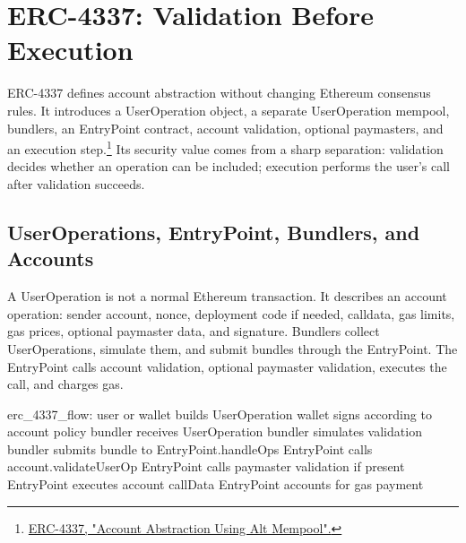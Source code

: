 \section{ERC-4337: Validation Before Execution}

ERC-4337 defines account abstraction without changing Ethereum consensus rules. It introduces a UserOperation object, a separate UserOperation mempool, bundlers, an EntryPoint contract, account validation, optional paymasters, and an execution step.\footnote{\href{https://eips.ethereum.org/EIPS/eip-4337}{ERC-4337, "Account Abstraction Using Alt Mempool".}} Its security value comes from a sharp separation: validation decides whether an operation can be included; execution performs the user's call after validation succeeds.

\subsection{UserOperations, EntryPoint, Bundlers, and Accounts}

A UserOperation is not a normal Ethereum transaction. It describes an account operation: sender account, nonce, deployment code if needed, calldata, gas limits, gas prices, optional paymaster data, and signature. Bundlers collect UserOperations, simulate them, and submit bundles through the EntryPoint. The EntryPoint calls account validation, optional paymaster validation, executes the call, and charges gas.

\begin{codeblock}
erc_4337_flow:
    user or wallet builds UserOperation
    wallet signs according to account policy
    bundler receives UserOperation
    bundler simulates validation
    bundler submits bundle to EntryPoint.handleOps
    EntryPoint calls account.validateUserOp
    EntryPoint calls paymaster validation if present
    EntryPoint executes account callData
    EntryPoint accounts for gas payment
\end{codeblock}

